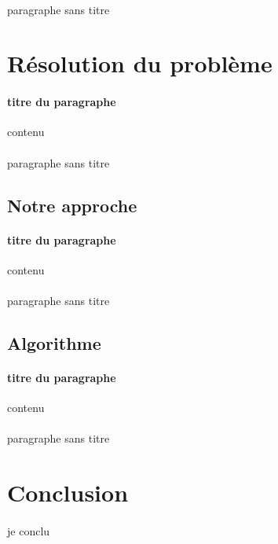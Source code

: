\documentclass[a4paper]{article}
\begin{document}
		\paragraph{}{paragraphe sans titre}
		
	\section{Résolution du problème}
		
		\paragraph{titre du paragraphe}{contenu}
		\paragraph{}{paragraphe sans titre}
		
		\subsection{Notre approche}
			\paragraph{titre du paragraphe}{contenu}
			\paragraph{}{paragraphe sans titre}
		\\
		\subsection{Algorithme}
			\paragraph{titre du paragraphe}{contenu}
			\paragraph{}{paragraphe sans titre}	
			
	\section*{Conclusion}
		\paragraph{}{je conclu}
		
\end{document}

